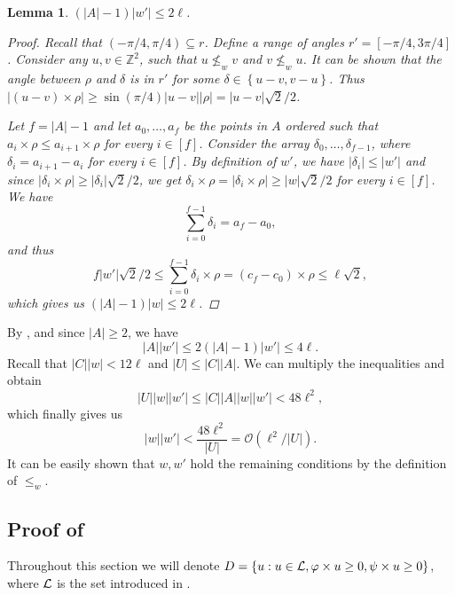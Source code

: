 \documentclass[11pt]{article}
\newcommand{\Z}{\mathbb{Z}}
\renewcommand{\O}{\mathcal{O}}
\newcommand{\set}[1]{\left\lbrace #1 \right\rbrace}
\theoremstyle{plain}
\newtheorem{lemma}{Lemma}
\theoremstyle{definition}
\theoremstyle{remark}
\begin{document}
\begin{lemma}\label{A_ineq}
	$(|A| - 1) |w'| \le 2\ell$. 
	\begin{proof}
		Recall that $(-\pi / 4, \pi / 4) \subseteq r$.
		Define a range of angles $r' = [-\pi / 4, 3\pi / 4]$.
		Consider any $u, v \in \Z^2$, such that $u \not \le_w v$ and $v \not \le_w u$.
		It can be shown that the angle between $\rho$ and $\delta$ is in $r'$ for some $\delta \in \set{u - v, v - u}$.
		Thus $|(u - v) \times \rho| \ge \sin(\pi / 4) |u - v||\rho| = |u - v|\sqrt{2} / 2$.
		
		Let $f = |A| - 1$ and let $a_0, \dots, a_{f}$ be the points in $A$ ordered such that $a_i \times \rho \le a_{i + 1} \times \rho$ for every $i \in [f]$.
		Consider the array $\delta_0, \dots, \delta_{f - 1}$, where $\delta_i = a_{i + 1} - a_i$ for every $i \in [f]$.
		By definition of $w'$, we have $|\delta_i| \le |w'|$ and since $|\delta_i \times \rho| \ge |\delta_i|\sqrt{2} / 2$, we get $\delta_i \times \rho = |\delta_i \times \rho| \ge |w| \sqrt{2} / 2$ for every $i \in [f]$.
		We have
		\[ \sum_{i = 0}^{f - 1} \delta_i = a_f - a_0,\]
		and thus
		\[ f|w'| \sqrt{2}/2 \le \sum_{i = 0}^{f - 1} \delta_i \times \rho = (c_f - c_0) \times \rho \le \ell \sqrt{2}, \]
		which gives us $(|A| - 1)|w| \le 2\ell$.
	\end{proof}
\end{lemma}

By , and since $|A| \ge 2$, we have
\[|A||w'| \le 2(|A| - 1) |w'| \le 4\ell.\]
Recall that $|C||w| < 12\ell$ and $|U| \le |C| |A|$. We can multiply the inequalities and obtain
\[ |U||w||w'| \le |C||A||w||w'| < 48 \ell^2,\]
which finally gives us
\[|w||w'| < \frac{48\ell^2}{|U|} = \O(\ell^2 / |U|). \]
It can be easily shown that $w, w'$ hold the remaining conditions by the definition of $\le_w$.


\newcommand{\W}{\mathcal{W}}
\subsection{Proof of } \label{subparquet_convolution_proof}
Throughout this section we will denote $D = \set{u : u \in \L, \h{u} \ge 0, \s{u} \ge 0}$, where $\mathcal{L}$ is the set introduced in .
\end{document}
